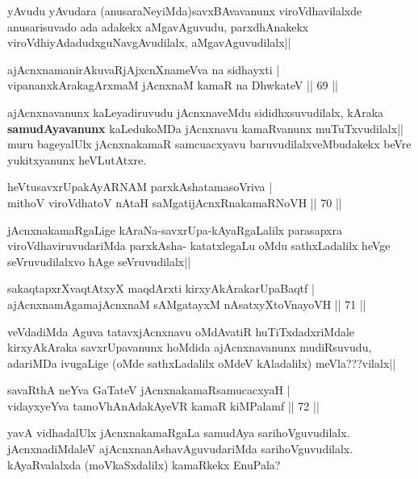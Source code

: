 \begin{artha}
yAvudu yAvudara (anusaraNeyiMda)savxBAvavanunx viroVdhavilalxde anusarisuvado ada adakekx aMgavAguvudu, parxdhAnakekx viroVdhiyAdadudxguNavgAvudilalx, aMgavAguvudilalx||
\end{artha}

\begin{shl}
ajAcnxnamanirAkuvaRjAjxcnXnameVva na sidhayxti |\\
vipananxkArakagArxmaM jAcnxnaM kamaR na DhwkateV \hfill || 69 ||
\end{shl}

\begin{artha}
ajAcnxnavanunx kaLeyadiruvudu jAcnxnaveMdu sididhxsuvudilalx, kAraka \textbf{samudAyavanunx} kaLedukoMDa jAcnxnavu kamaRvanunx muTuTxvudilalx|| muru bageyalUlx jAcnxnakamaR samcuacxyavu baruvudilalxveMbudakekx beVre yukitxyanunx heVLutAtxre.
\end{artha}

\begin{shl}
heVtusavxrUpakAyARNAM parxkAshatamasoVriva |\\
mithoV viroVdhatoV nAtaH saMgatijAcnxRnakamaRNoVH \hfill || 70 ||
\end{shl}

\begin{artha}
jAcnxnakamaRgaLige kAraNa-savxrUpa-kAyaRgaLalilx parasapxra viroVdhaviruvudariMda parxkAsha- katatxlegaLu oMdu sathxLadalilx heVge seVruvudilalxvo hAge seVruvudilalx||
\end{artha}

\begin{shl}
sakaqtapxrXvaqtAtxyX maqdArxti kirxyAkArakarUpaBaqtf |\\
ajAcnxnamAgamajAcnxnaM sAMgatayxM nAsatxyXtoV\s nayoVH \hfill || 71 ||
\end{shl}

\begin{artha}
veVdadiMda Aguva tatavxjAcnxnavu oMdAvatiR huTiTxdadxriMdale kirxyAkAraka savxrUpavanunx hoMdida ajAcnxnavanunx mudiRsuvudu, adariMDa ivugaLige (oMde sathxLadalilx oMdeV kAladalilx) meVla???vilalx||
\end{artha}

\begin{shl}
savaRthA neYva GaTateV jAcnxnakamaRsamucacxyaH |\\
vidayxyeYva tamoVhAnAdakAyeVR kamaR kiMPalamf \hfill || 72 ||
\end{shl}

\begin{artha}
yavA vidhadalUlx jAcnxnakamaRgaLa samudAya sarihoVguvudilalx. jAcnxnadiMdaleV ajAcnxnanAshavAguvudariMda sarihoVguvudilalx. kAyaRvalalxda (moVkaSxdalilx) kamaRkekx EnuPala?
\end{artha}

